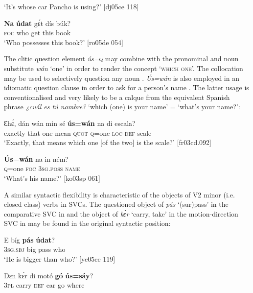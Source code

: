\glt ‘It’s whose car Pancho is using?’ [dj05ce 118]
\z


\ea%
    \label{ex:key:603}
    \gll \textbf{Na}  \textbf{údat}  gɛ́t  dís  búk?\\
\textsc{foc}  who    get  this  book\\

\glt ‘Who possesses this book?’ [ro05de 054]
\z

The clitic question element \textit{ús=}\textsc{q}\textit{} may combine with the pronominal and noun substitute \textit{wán} ‘one’ in order to render the concept ‘\textsc{which} \textsc{one’.} The collocation may be used to selectively question any noun . \textit{\'{U}s=wán} is also employed in an idiomatic question clause in order to ask for a person’s name . The latter usage is conventionalised and very likely to be a calque from the equivalent Spanish phrase \textit{¿cuál es tú nombre?} ‘which (one) is your name’ = ‘what’s your name?’:


\ea%
    \label{ex:key:604}
    \gll Ɛhɛ́,    dán  wán  min    sé    \textbf{ús=wán}  na  di  escala?\\
exactly  that  one  mean  \textsc{quot}    \textsc{q}=one  \textsc{loc}  \textsc{def}  scale\\

\glt ‘Exactly, that means which one [of the two] is the scale?’ [fr03cd.092]
\z


\ea%
    \label{ex:key:605}
    \gll \textbf{\'{U}s=wán}  na  in    ném?\\
\textsc{q}=one  \textsc{foc}  \textsc{3sg.poss}  \textsc{name}\\

\glt ‘What’s his name?’ [ko03sp 061]
\z

A similar syntactic flexibility is characteristic of the objects of V2 minor (i.e. closed class) verbs in SVCs. The questioned object of \textit{pás} ‘(sur)pass’ in the comparative SVC{\fff} in  and the object of \textit{kɛ́r} ‘carry, take’ in the motion-direction SVC in  may be found in the original syntactic position:


\ea%
    \label{ex:key:606}
    \gll E    bíg  \textbf{pás}    \textbf{údat}?\\
\textsc{3sg.sbj}  big  pass    who\\

\glt ‘He is bigger than who?’ [ye05ce 119]
\z


\ea%
    \label{ex:key:607}
    \gll Dɛn  kɛ́r    di  motó  \textbf{gó}  \textbf{ús=sáy}?\\
\textsc{3pl}  carry  \textsc{def}  car    go  where\\

